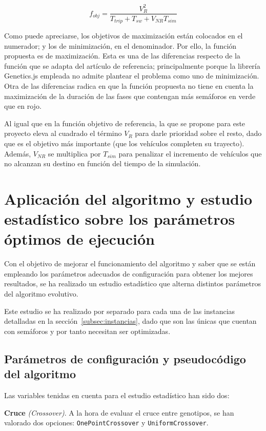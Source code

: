 $$
f_{obj} = \frac{V_R^2}{T_{trip} + T_{sw} + V_{NR} T_{sim}}
$$

Como puede apreciarse, los objetivos de maximización están colocados en el numerador; y los de minimización, en el denominador. Por ello, la función propuesta es de maximización. Esta es una de las diferencias respecto de la función que se adapta del artículo de referencia; principalmente porque la librería Genetics.js empleada no admite plantear el problema como uno de minimización. Otra de las diferencias radica en que la función propuesta no tiene en cuenta la maximización de la duración de las fases que contengan más semáforos en verde que en rojo.

Al igual que en la función objetivo de referencia, la que se propone para este proyecto eleva al cuadrado el término $V_R$ para darle prioridad sobre el resto, dado que es el objetivo más importante (que los vehículos completen su trayecto). Además, $V_{NR}$ se multiplica por $T_{sim}$ para penalizar el incremento de vehículos que no alcanzan su destino en función del tiempo de la simulación.

\section{Aplicación del algoritmo y estudio estadístico sobre los parámetros óptimos de ejecución}

Con el objetivo de mejorar el funcionamiento del algoritmo y saber que se están empleando los parámetros adecuados de configuración para obtener los mejores resultados, se ha realizado un estudio estadístico que alterna distintos parámetros del algoritmo evolutivo.

Este estudio se ha realizado por separado para cada una de las instancias detalladas en la sección~\ref{subsec:instancias}, dado que son las únicas que cuentan con semáforos y por tanto necesitan ser optimizadas.

\subsection{Parámetros de configuración y pseudocódigo del algoritmo}
\label{subsec:parametros}

Las variables tenidas en cuenta para el estudio estadístico han sido dos:

\textbf{Cruce} \textit{(Crossover)}. A la hora de evaluar el cruce entre genotipos, se han valorado dos opciones: \texttt{OnePointCrossover} y \texttt{UniformCrossover}.

